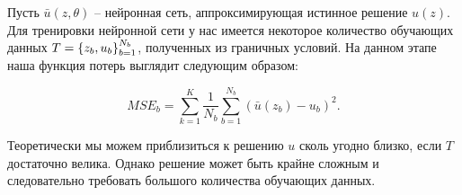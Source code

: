 \documentclass[a4paper,14pt]{extarticle} %
\begin{document}






Пусть $\bar{u}(z, \theta)$ -- нейронная сеть, аппроксимирующая истинное решение $u(z)$. Для тренировки нейронной сети у нас имеется некоторое количество обучающих данных $T={\left\{ z_b, u_b \right\}}_{b=1}^{N_b}$, полученных из граничных условий. На данном этапе наша функция потерь выглядит следующим образом:

\begin{equation}
    MSE_b = \sum_{k=1}^{K}\frac{1}{N_b}\sum_{b=1}^{N_b} (\bar{u}(z_b) - u_b)^2.
\end{equation}

Теоретически мы можем приблизиться к решению $u$ сколь угодно близко, если $T$ достаточно велика. Однако решение может быть крайне сложным и следовательно требовать большого количества обучающих данных.
\end{document}
